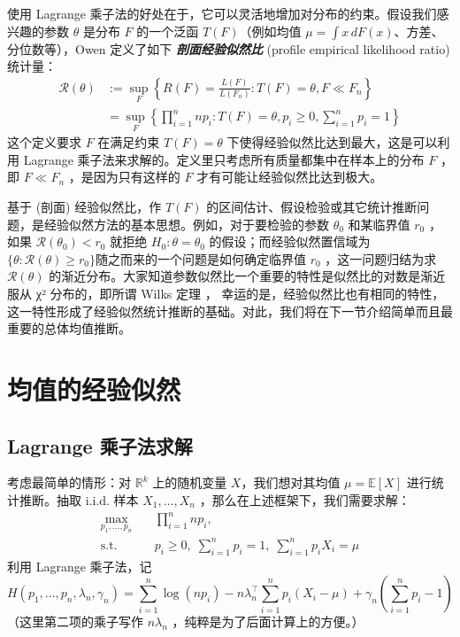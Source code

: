 使用 Lagrange 乘子法的好处在于，它可以灵活地增加对分布的约束。假设我们感兴趣的参数 $\theta$ 是分布 $F$ 的一个泛函 $T(F)$（例如均值 $\mu = \int x\, dF(x)$、方差、分位数等），Owen 定义了如下 \textbf{\emph{剖面经验似然比}} (profile empirical likelihood ratio) 统计量：\[
\begin{aligned}\mathcal{R}(\theta) &:= \sup_F \left\{ R(F)=\frac{L(F)}{L(F_n)}:T(F)=\theta,F\ll F_n \right\} \\ &=\sup_F\left\{\prod_{i=1}^nnp_i:T(F)=\theta,p_i\ge 0,\sum_{i=1}^np_i=1\right\} \end{aligned}\]
这个定义要求 $F$ 在满足约束 $T(F)=\theta$ 下使得经验似然比达到最大，这是可以利用 Lagrange 乘子法来求解的。定义里只考虑所有质量都集中在样本上的分布 $F$ ，即 $F\ll F_n$ ，是因为只有这样的 $F$ 才有可能让经验似然比达到极大。

基于 (剖面) 经验似然比，作 $T(F)$ 的区间估计、假设检验或其它统计推断问题，是经验似然方法的基本思想。例如，对于要检验的参数 $\theta_0$ 和某临界值 $r_0$ ，如果 $\mathcal R(\theta_0)<r_0$ 就拒绝 $H_0:\theta=\theta_0$ 的假设；而经验似然置信域为 $\{\theta:\mathcal R(\theta)\ge r_0\}$随之而来的一个问题是如何确定临界值 $r_0$ ，这一问题归结为求 $\mathcal R(\theta)$ 的渐近分布。大家知道参数似然比一个重要的特性是似然比的对数是渐近服从 χ² 分布的，即所谓 Wilks 定理 ， 幸运的是，经验似然比也有相同的特性，这一特性形成了经验似然统计推断的基础。对此，我们将在下一节介绍简单而且最重要的总体均值推断。

\section{均值的经验似然}

\subsection{Lagrange 乘子法求解}

考虑最简单的情形：对 $\mathbb R^k$ 上的随机变量 $X$，我们想对其均值 $\mu = \mathbb{E}[X]$ 进行统计推断。抽取 i.i.d. 样本 $X_1,\dots,X_n$ ，那么在上述框架下，我们需要求解：\[
\begin{aligned} \max_{p_1,\dots,p_n} &\quad \prod_{i=1}^n n p_i, \\ \text{s.t.} &\quad p_i \ge 0,\; \sum_{i=1}^n p_i = 1,\; \sum_{i=1}^n p_i X_i = \mu \end{aligned}\]
利用 Lagrange 乘子法，记\[
H(p_1,\dots,p_n, \lambda_n, \gamma_n) = \sum_{i=1}^n \log(n p_i) - n\lambda_n^\top \sum_{i=1}^n p_i (X_i - \mu) + \gamma_n\left(\sum_{i=1}^n p_i - 1\right)\]
（这里第二项的乘子写作 $n\lambda_n$ ，纯粹是为了后面计算上的方便。）

